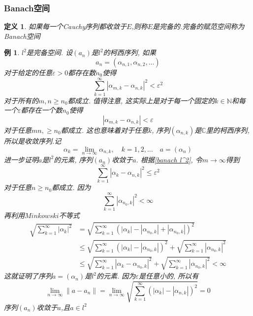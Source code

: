 \documentclass[a4paper,11pt]{article}
\newtheorem{definition}{\hspace{2em}定义}[section]
\newtheorem{example}{例}[section]
\begin{document}
\subsubsection*{Banach空间}
\begin{definition}
  如果每一个Cauchy序列都收敛于$E$,则称$E$是完备的.完备的赋范空间称为Banach空间
\end{definition}
\begin{example}\label{l^2 complete}
  $l^2$是完备空间. 设$(a_n)$是$l^2$的柯西序列, 如果
  \begin{equation*}
    a_n=(\alpha_{n,1},\alpha_{n,2},\dots)
  \end{equation*}
  对于给定的任意$\varepsilon>0$都存在数$n_0$使得
  \begin{equation*}\label{banach l^2}
    \sum_{k=1}^{\infty}|\alpha_{m,k}-\alpha_{n,k}|^2<\varepsilon^2
  \end{equation*}
  对于所有的$m,n\geq n_0$都成立. 值得注意, 这实际上是对于每一个固定的$k\in \mathbb{N}$和每一个$\varepsilon$都存在一个数$n_0$使得
  \begin{equation*}
    |\alpha_{m,k}-\alpha_{n,k}|<\varepsilon
  \end{equation*}
  对于任意$mn,\geq n_0$都成立. 这也意味着对于任意$k$, 序列$(\alpha_{n,k})$是$\mathbb{C}$里的柯西序列, 所以是收敛序列.记
  \begin{equation*}
    \alpha_k=\lim_{n\to\infty}\alpha_{n,k},\quad k=1,2,\dots\quad a=(\alpha_{n})
  \end{equation*}
  进一步证明$a$是$l^2$的元素, 序列$(a_n)$收敛于$a$. 根据\eqref{banach l^2}, 令$m\to \infty$得到
  \begin{equation*}
    \sum_{k=1}^{\infty}|\alpha_k-\alpha_{n,k}|^2\leq\varepsilon^2
  \end{equation*}
  对于任意$n\geq n_0$都成立. 因为
  \begin{equation*}
    \sum_{k=1}^{\infty}|\alpha_{n_0,k}|^2<\infty
  \end{equation*}
  再利用$Minkowski$不等式
  \begin{equation*}
  \begin{split}
     \sqrt{\sum_{k=1}^{\infty}|\alpha_k|^2}&=\sqrt{\sum_{k=1}^{\infty}(|\alpha_k|-|\alpha_{n_0,k}|+|\alpha_{n_0,k}|)^2} \\
       &\leq\sqrt{\sum_{k=1}^{\infty}(|\alpha_k|-|\alpha_{n_0,k}|)^2}+\sqrt{\sum_{k=1}^{\infty}|\alpha_{n_0,k}|^2}\\
       &\leq\sqrt{\sum_{k=1}^{\infty}|\alpha_k-\alpha_{n_0,k}|^2}+\sqrt{\sum_{k=1}^{\infty}|\alpha_{n_0,k}|^2}<\infty
  \end{split}
  \end{equation*}
  这就证明了序列$a=(\alpha_n)$是$l^2$的元素. 因为$\varepsilon$是任意小的, 所以有
  \begin{equation*}
    \lim_{n\to\infty}\|a-a_n\|=\lim_{n\to\infty}\sqrt{\sum_{k=1}^{\infty}(|\alpha_k|-|\alpha_{n,k}|)^2}=0
  \end{equation*}
  序列$(a_n)$收敛于$a$,且$a\in l^2$
\end{example}
\end{document}
